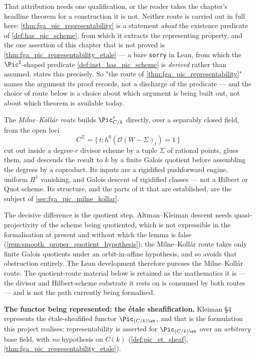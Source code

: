 That attribution needs one qualification, or the reader takes the chapter's headline
theorem for a construction it is not. Neither route is carried out in full here:
\cref{thm:fga_pic_representability} is a statement \emph{about} the existence predicate
of \cref{def:has_pic_scheme}, from which it extracts the representing property, and the
one assertion of this chapter that is not proved is
\cref{thm:fga_pic_representability_etale} --- a bare \texttt{sorry} in Lean, from which
the \(\Pic^\sharp\)-shaped predicate \cref{def:inst_has_pic_scheme} is
\emph{derived} rather than assumed.  states this
precisely.
So "the route of \cref{thm:fga_pic_representability}" names the argument its proof
records, not a discharge of the predicate --- and the choice of route below is a choice
about which argument is being built out, not about which theorem is available today.

The \emph{Milne--Koll\'ar route} builds \(\Pic^r_{C/k}\) directly, over a
separably closed field, from the open loci
\[
  C^\Sigma = \{\,t : h^0(\mathcal{O}(W - \Sigma)_t) = 1\,\}
\]
cut out inside a degree-\(r\) divisor scheme by a tuple \(\Sigma\) of rational
points, glues them, and descends the result to \(k\) by a finite Galois quotient
before assembling the degrees by a coproduct. Its inputs are a rigidified
pushforward engine, uniform \(H^1\) vanishing, and Galois descent of rigidified
classes --- not a Hilbert or Quot scheme. Its structure, and the parts of it that
are established, are the subject of \cref{sec:fga_pic_milne_kollar}.

The decisive difference is the quotient step. Altman--Kleiman descent needs
quasi-projectivity of the scheme being quotiented, which is not expressible in
the formalisation at present and without which the lemma is false
(\cref{rem:smooth_proper_quotient_hypothesis}); the Milne--Koll\'ar route takes
only finite Galois quotients under an orbit-in-affine hypothesis, and so avoids
that obstruction entirely. The Lean development therefore pursues the
Milne--Koll\'ar route. The quotient-route material below is retained as the
mathematics it is --- the divisor and Hilbert-scheme substrate it rests on is
consumed by both routes --- and is not the path currently being formalised.

\medskip

\textbf{The functor being represented: the \'etale sheafification.} Kleiman \S 4
represents the \'etale-sheafified functor \(\Pic_{(C/k)\et}\), and that is the
formulation this project realises: representability is asserted for
\(\Pic_{(C/k)\et}\) over an \emph{arbitrary} base field, with \emph{no}
hypothesis on \(C(k)\) (\cref{def:pic_et_sheaf},
\cref{thm:fga_pic_representability_etale}).

